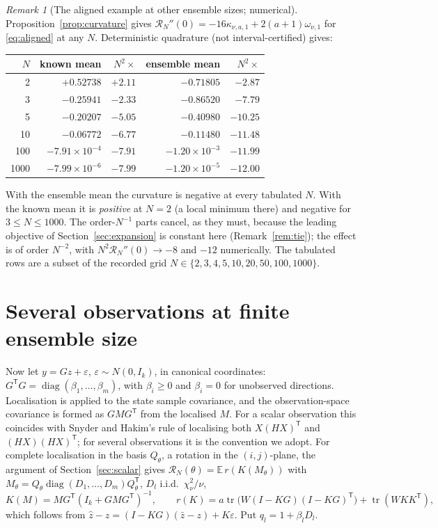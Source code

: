 \documentclass[11pt,a4paper]{article}
\numberwithin{equation}{section}
\theoremstyle{remark}\newtheorem{remark}[theorem]{Remark}
\newcommand{\E}{\mathbb E}
\newcommand{\tr}{\operatorname{tr}}
\newcommand{\diag}{\operatorname{diag}}
\newcommand{\risk}{\mathcal R}
\newcommand{\T}{^{\mathsf T}}
\begin{document}
\begin{remark}[The aligned example at other ensemble sizes; numerical]\label{rem:alignedN}
Proposition~\ref{prop:curvature} gives \(\risk_N''(0)=-16\kappa_{\nu,a,1}+2(a+1)\omega_{\nu,1}\)
for \eqref{eq:aligned} at any \(N\). Deterministic quadrature (not interval-certified) gives:
\begin{center}
\small
\begin{tabular}{rrrrr}
\toprule
\(N\)&known mean&\(N^2\times\)&ensemble mean&\(N^2\times\)\\
\midrule
2&\(+0.52738\)&\(+2.11\)&\(-0.71805\)&\(-2.87\)\\
3&\(-0.25941\)&\(-2.33\)&\(-0.86520\)&\(-7.79\)\\
5&\(-0.20207\)&\(-5.05\)&\(-0.40980\)&\(-10.25\)\\
10&\(-0.06772\)&\(-6.77\)&\(-0.11480\)&\(-11.48\)\\
100&\(-7.91\times10^{-4}\)&\(-7.91\)&\(-1.20\times10^{-3}\)&\(-11.99\)\\
1000&\(-7.99\times10^{-6}\)&\(-7.99\)&\(-1.20\times10^{-5}\)&\(-12.00\)\\
\bottomrule
\end{tabular}
\end{center}
With the ensemble mean the curvature is negative at every tabulated \(N\). With the known mean
it is \emph{positive} at \(N=2\) (a local minimum there) and negative for \(3\le N\le1000\). The
order-\(N^{-1}\) parts cancel, as they must, because the leading objective of
Section~\ref{sec:expansion} is constant here (Remark~\ref{rem:tie}); the effect is of order
\(N^{-2}\), with \(N^2\risk_N''(0)\to-8\) and \(-12\) numerically. The tabulated rows are a subset
of the recorded grid \(N\in\{2,3,4,5,10,20,50,100,1000\}\).
\end{remark}

\section{Several observations at finite ensemble size}\label{sec:vector}

Now let \(y=Gz+\varepsilon\), \(\varepsilon\sim N(0,I_k)\), in canonical coordinates:
\(G\T G=\diag(\beta_1,\ldots,\beta_m)\), with \(\beta_i\ge0\) and \(\beta_i=0\) for unobserved
directions. Localisation is applied to the state sample covariance, and the
observation-space covariance is formed as \(GMG\T\) from the localised \(M\). For a scalar
observation this coincides with Snyder and Hakim's rule of localising both
\(X(HX)\T\) and \((HX)(HX)\T\); for several observations it is the convention we adopt. For
complete localisation in the basis \(Q_\theta\), a rotation in the \((i,j)\)-plane, the argument of
Section~\ref{sec:scalar} gives \(\risk_N(\theta)=\E\,r(K(M_\theta))\) with
\(M_\theta=Q_\theta\diag(D_1,\ldots,D_m)Q_\theta\T\), \(D_l\) i.i.d.\ \(\chi^2_\nu/\nu\),
\[
 K(M)=MG\T(I_k+GMG\T)^{-1},\qquad
 r(K)=a\tr\bigl(W(I-KG)(I-KG)\T\bigr)+\tr(WKK\T),
\]
which follows from \(\widehat z-z=(I-KG)(\bar z-z)+K\varepsilon\). Put \(q_l=1+\beta_lD_l\).
\end{document}
